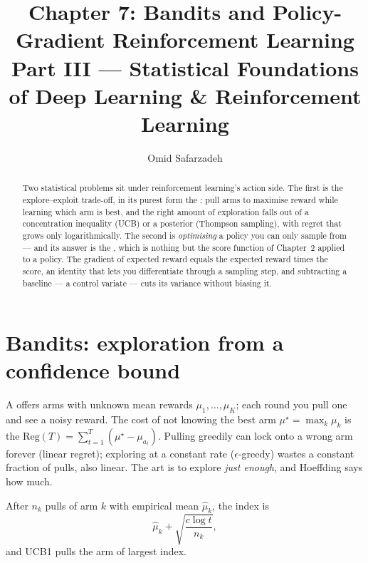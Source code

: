 \documentclass[11pt]{article}
\title{Chapter 7: Bandits and Policy-Gradient Reinforcement Learning \\ \large Part III --- Statistical Foundations of Deep Learning \& Reinforcement Learning}
\author{Omid Safarzadeh}
\date{}
\begin{document}
\maketitle

\begin{abstract}
\noindent
Two statistical problems sit under reinforcement learning's action side.
The first is the explore--exploit trade-off, in its purest form the
: pull arms to maximise reward while learning which
arm is best, and the right amount of exploration falls out of a concentration
inequality (UCB) or a posterior (Thompson sampling), with regret that grows only
logarithmically. The second is \emph{optimising} a policy you can only sample
from --- and its answer is the , which is nothing but the
score function of Chapter~2 applied to a policy. The gradient of expected reward
equals the expected reward times the score, an identity that lets you
differentiate through a sampling step, and subtracting a baseline --- a control
variate --- cuts its variance without biasing it.
\end{abstract}

\tableofcontents

\section{Bandits: exploration from a confidence bound}

A  offers arms with unknown mean rewards
$\mu_1,\dots,\mu_K$; each round you pull one and see a noisy reward. The cost of
not knowing the best arm $\mu^\star=\max_k\mu_k$ is the 
$\mathrm{Reg}(T)=\sum_{t=1}^T(\mu^\star-\mu_{a_t})$. Pulling greedily can lock
onto a wrong arm forever (linear regret); exploring at a constant rate
($\epsilon$-greedy) wastes a constant fraction of pulls, also linear. The art is
to explore \emph{just enough}, and Hoeffding says how much.

\begin{definition}
After $n_k$ pulls of arm $k$ with empirical mean $\hat\mu_k$, the 
index is
\[
  \hat\mu_k + \sqrt{\frac{c\log t}{n_k}},
\]
and UCB1 pulls the arm of largest index.
\end{definition}
\end{document}
